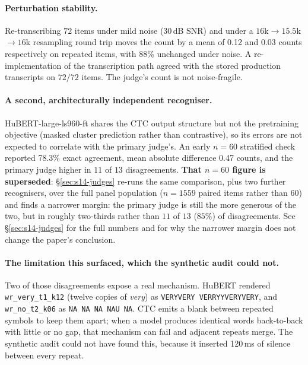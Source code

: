 \documentclass[11pt]{article}
\begin{document}
\paragraph{Perturbation stability.}
Re-transcribing $72$ items under mild noise (30\,dB SNR) and under a
$16$k$\rightarrow$$15.5$k$\rightarrow$$16$k resampling round trip moves the count
by a mean of 0.12 and 0.03 counts respectively on repeated items, with
88\% unchanged under noise. A re-implementation of the transcription path
agreed with the stored production transcripts on $72/72$ items. The judge's count
is not noise-fragile.

\paragraph{A second, architecturally independent recogniser.}
HuBERT-large-ls960-ft shares the CTC output structure but not the pretraining
objective (masked cluster prediction rather than contrastive), so its errors are
not expected to correlate with the primary judge's. An early $n{=}60$
stratified check reported 78.3\% exact agreement, mean absolute difference
0.47 counts, and the primary judge higher in $11$ of $13$ disagreements.
\textbf{That $n{=}60$ figure is superseded}: \S\ref{sec:s14-judges} re-runs the
same comparison, plus two further recognisers, over the full panel population
($n{=}1559$ paired items rather than $60$) and finds a narrower margin: the
primary judge is still the more generous of the two, but in roughly
two-thirds rather than $11$ of $13$ ($85\%$) of disagreements. See
\S\ref{sec:s14-judges} for the full numbers and for why the narrower margin
does not change the paper's conclusion.

\paragraph{The limitation this surfaced, which the synthetic audit could not.}
Two of those disagreements expose a real mechanism. HuBERT rendered
\texttt{wr\_very\_t1\_k12} (twelve copies of \emph{very}) as
\texttt{VERYVERY VERRYYVERYVERY}, and \texttt{wr\_no\_t2\_k06} as
\texttt{NA NA NA NAU NA}. CTC emits a blank between repeated symbols to keep them
apart; when a model produces identical words back-to-back with little or no gap,
that mechanism can fail and adjacent repeats merge. The synthetic audit could not
have found this, because it inserted 120\,ms of silence between
every repeat.
\end{document}
